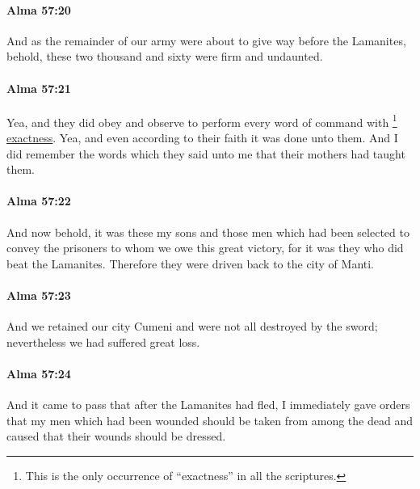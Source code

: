 		\paragraph{Alma 57:20} %
			\label{ALMA-57-20}

			And as the remainder of our army were about to give way before the Lamanites,
			behold, these two thousand and sixty were firm and undaunted.

		\paragraph{Alma 57:21} %
			\label{ALMA-57-21}

			Yea, and they did obey and observe to perform
			every word of command with
				\footnote{%
					This is the only occurrence of ``exactness'' in all the scriptures. 
					}%
			\hyperref[EXACTNESS]{exactness}.
			Yea, and even according to their faith it was done unto them.
			And I did remember the words which they said unto me
			that their mothers had taught them.

		\paragraph{Alma 57:22} %
			\label{ALMA-57-22}

			And now behold, it was these my sons
			and those men which had been selected to convey the prisoners
			to whom we owe this great victory,
			for it was they who did beat the Lamanites.
			Therefore they were driven back to the city of Manti.

		\paragraph{Alma 57:23} %
			\label{ALMA-57-23}

			And we retained our city Cumeni
			and were not all destroyed by the sword;
			nevertheless we had suffered great loss.

		\paragraph{Alma 57:24} %
			\label{ALMA-57-24}

			And it came to pass that after the Lamanites had fled,
			I immediately gave orders that my men which had been wounded
			should be taken from among the dead
			and caused that their wounds should be dressed.

